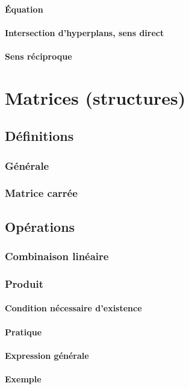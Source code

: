 \documentclass[12pt,a4paper,french]{book}
\begin{document}
			\subsubsection{Équation}
			\subsubsection{Intersection d'hyperplans, sens direct}
			\subsubsection{Sens réciproque}

\chapter{Matrices (structures)}
	\section{Définitions}
		\subsection{Générale}
		\subsection{Matrice carrée}
	\section{Opérations}
		\subsection{Combinaison linéaire}
		\subsection{Produit}
			\subsubsection{Condition nécessaire d'existence}
			\subsubsection{Pratique}
			\subsubsection{Expression générale}
			\subsubsection{Exemple}
\end{document}
